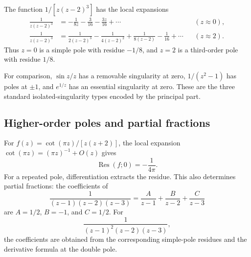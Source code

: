 \begin{example}
The function $1/[z(z-2)^3]$ has the local expansions
\begin{align}
\frac{1}{z(z-2)^3}&=-\frac{1}{8z}-\frac{3}{16}-\frac{3z}{16}+\cdots &&(z\approx0),\\
\frac{1}{z(z-2)^3}&=\frac{1}{2(z-2)^3}-\frac{1}{4(z-2)^2}+\frac{1}{8(z-2)}-\frac{1}{16}+\cdots &&(z\approx2).
\end{align}
Thus $z=0$ is a simple pole with residue $-1/8$, and $z=2$ is a third-order pole with residue $1/8$.
\end{example}

For comparison, $\sin z/z$ has a removable singularity at zero, $1/(z^2-1)$ has poles at $\pm1$, and $e^{1/z}$ has an essential singularity at zero. These are the three standard isolated-singularity types encoded by the principal part.

\subsection{Higher-order poles and partial fractions}

For $f(z)=\cot(\pi z)/[z(z+2)]$, the local expansion $\cot(\pi z)=(\pi z)^{-1}+O(z)$ gives
\begin{equation}
\operatorname{Res}(f;0)=-\frac{1}{4\pi}.
\end{equation}
For a repeated pole, differentiation extracts the residue. This also determines partial fractions: the coefficients of
\begin{equation}
\frac{1}{(z-1)(z-2)(z-3)}=\frac{A}{z-1}+\frac{B}{z-2}+\frac{C}{z-3}
\end{equation}
are $A=1/2$, $B=-1$, and $C=1/2$. For
\begin{equation}
\frac{1}{(z-1)^2(z-2)(z-3)},
\end{equation}
the coefficients are obtained from the corresponding simple-pole residues and the derivative formula at the double pole.